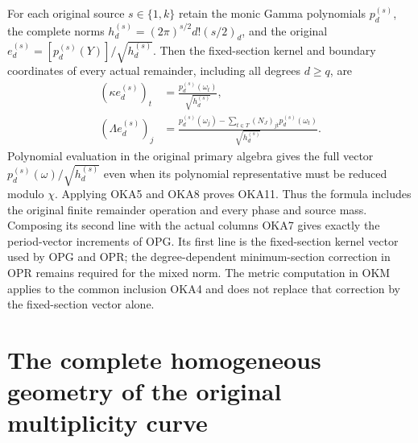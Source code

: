 \documentclass[11pt,a4paper]{article}
\begin{document}
For each original source $s\in\{1,k\}$ retain the monic
Gamma polynomials $p_d^{(s)}$, the complete norms
$h_d^{(s)}=(2\pi)^{s/2}d!(s/2)_d$, and the original
$e_d^{(s)}=[p_d^{(s)}(Y)]/\sqrt{h_d^{(s)}}$. Then the
fixed-section kernel and boundary coordinates of every actual
remainder, including all degrees $d\geq q$, are
\[
 \begin{split}
 (\kappa e_d^{(s)})_t
      &=\frac{p_d^{(s)}(\omega_t)}{\sqrt{h_d^{(s)}}},\\
 (\Lambda e_d^{(s)})_j
      &=\frac{p_d^{(s)}(\omega_j)
                -\sum_{t\in T}(N_J)_{jt}p_d^{(s)}(\omega_t)}
              {\sqrt{h_d^{(s)}}}.
 \end{split}\tag{OKA11}
\]
Polynomial evaluation in the original primary algebra gives the
full vector $p_d^{(s)}(\omega)/\sqrt{h_d^{(s)}}$ even when
its polynomial representative must be reduced modulo $\chi$.
Applying OKA5 and OKA8 proves OKA11. Thus the formula includes
the original finite remainder operation and every phase and source
mass. Composing its second line with the actual columns OKA7
gives exactly the period-vector increments of OPG. Its first line
is the fixed-section kernel vector used by OPG and OPR; the
degree-dependent minimum-section correction in OPR remains
required for the mixed norm. The metric computation in OKM
applies to the common inclusion OKA4 and does not replace that
correction by the fixed-section vector alone.


\clearpage
\section{The complete homogeneous geometry of the original multiplicity curve}
\label{sec:OMG}
\end{document}
